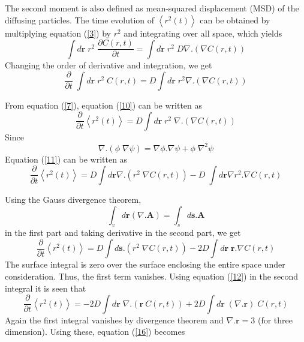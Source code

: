  \noindent The second moment is also defined as mean-squared displacement (MSD) of the diffusing particles. The time evolution of $\left\langle r^2(t) \right\rangle$ can be obtained by multiplying equation (\ref{3}) by $r^2$ and integrating over all space, which yields
 \begin{equation}
 \int d\textbf{r}\;r^2\;\frac{\partial C(r,t)}{\partial t} = \int d\textbf{r}\; r^2\;D \nabla .(\nabla C(r,t))
 \end{equation}
 \noindent Changing the order of derivative and integration, we get
 \begin{equation}\label{10}
 \frac{\partial}{\partial t}\;\int d\textbf{r}\;r^2\; C(r,t) = D \int d\textbf{r}\;r^2 \nabla .(\nabla C(r,t))
 \end{equation}

  \noindent From equation (\ref{7}), equation (\ref{10}) can be written as 
 \begin{equation}\label{11}
 \frac{\partial}{\partial t} \left\langle r^2(t) \right\rangle = D \int d\textbf{r}\;r^2\;\nabla.(\nabla C(r,t))
 \end{equation}
 \noindent Since
 \begin{equation}\label{12}
 \nabla .(\phi\;\nabla\psi) = \nabla\phi . \nabla\psi + \phi\;\nabla^2\psi
 \end{equation}
 \noindent Equation (\ref{11}) can be written as 
 \begin{equation}
 \frac{\partial}{\partial t} \left\langle r^2(t) \right\rangle = D \int d\mathbf{r} \nabla .(r^2\;\nabla C(r,t)) - D\;\int d\textbf{r} \nabla r^2 . \nabla C(r,t)
 \end{equation}
 
 \noindent Using the Gauss divergence theorem,
 \begin{equation}
 \int_v d\mathbf{r} (\nabla . \mathbf{A}) = \int_s d\mathbf{s}.\mathbf{A}
 \end{equation}
 \noindent in the first part and taking derivative in the second part, we get
 \begin{equation}
 \frac{\partial}{\partial t} \left\langle r^2(t) \right\rangle  = D \int d\mathbf{s}.(r^2\; \nabla C(r,t)) - 2D\int d\mathbf{r}\;\mathbf{r}.\nabla C(r,t)
 \end{equation}
 \noindent The surface integral is zero over the surface enclosing the entire space under consideration. Thus, the first term vanishes. Using equation (\ref{12}) in the second integral it is seen that 
 \begin{equation}\label{16}
 \frac{\partial}{\partial t} \left\langle r^2(t) \right\rangle = -2D \int d\textbf{r}\; \nabla .(\textbf{r}~C(r,t)) + 2D \int d\textbf{r}\;(\nabla .\textbf{r})\;C(r,t)
 \end{equation}
 \noindent Again the first integral vanishes by divergence theorem and $\nabla .\textbf{r} = 3$ (for three dimension). Using these, equation (\ref{16}) becomes
 
